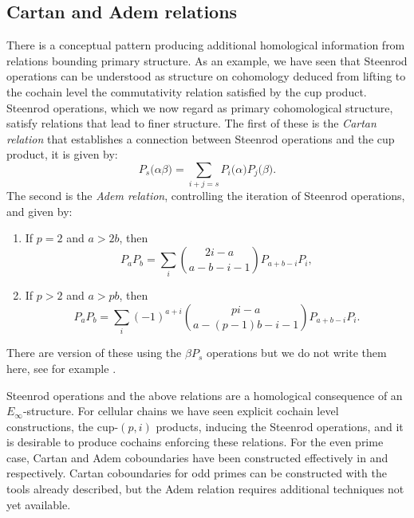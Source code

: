 \subsection{Cartan and Adem relations}

There is a conceptual pattern producing additional homological information from relations bounding primary structure.
As an example, we have seen that Steenrod operations can be understood as structure on cohomology deduced from lifting to the cochain level the commutativity relation satisfied by the cup product.
Steenrod operations, which we now regard as primary cohomological structure, satisfy relations that lead to finer structure.
The first of these is the \textit{Cartan relation} that establishes a connection between Steenrod operations and the cup product, it is given by:
\begin{equation*}
	P_s\big(\alpha \beta \big) = \sum_{i+j=s} P_i\big( \alpha \big) P_j\big( \beta \big).
\end{equation*}
The second is the \textit{Adem relation}, controlling the iteration of Steenrod operations, and given by:
\begin{enumerate}
	\item If $p = 2$ and $a > 2b$, then
	\begin{equation*}
		P_{a} P_{b} = \sum_i \binom{2i-a}{a-b-i-1} P_{a+b-i}P_i,
	\end{equation*}
	\item If $p > 2$ and $a > pb$, then
	\begin{equation*}
		P_{a} P_{b} = \sum_i (-1)^{a+i} \binom{pi-a}{a-(p-1)b-i-1} P_{a+b-i}P_i.
	\end{equation*}
\end{enumerate}
There are version of these using the $\beta P_s$ operations but we do not write them here, see for example \cite{steenrod1962cohomology, may1970general}.

Steenrod operations and the above relations are a homological consequence of an $E_\infty$-structure.
For cellular chains we have seen explicit cochain level constructions, the cup-$(p,i)$ products, inducing the Steenrod operations, and it is desirable to produce cochains enforcing these relations.
For the even prime case, Cartan and Adem coboundaries have been constructed effectively in \cite{medina2020cartan} and \cite{medina2021adem} respectively.
Cartan coboundaries for odd primes can be constructed with the tools already described, but the Adem relation requires additional techniques not yet available.

